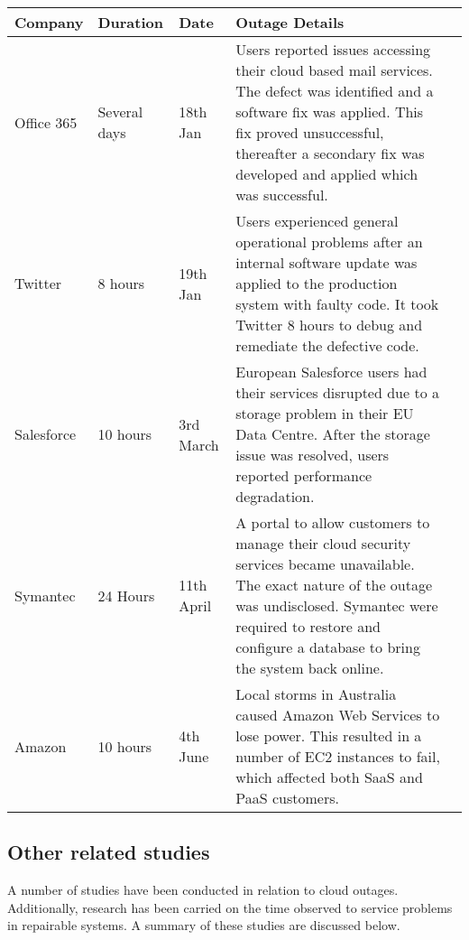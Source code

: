 \documentclass[5p]{elsarticle}
\begin{document}
\begin {table*}[]
\caption {Summary of high profile Cloud outages in the first half of 2016} 
\begin{flushleft}

\begin{tabular}{l | l | l | p{11.4cm} l} \bf {Company} & \bf {Duration} & \bf {Date} & \bf {Outage Details}  
\\ \hline Office 365 & Several days &  18th Jan & Users reported issues accessing their cloud based mail services. The defect was identified and a software fix was applied. This fix proved unsuccessful, thereafter  a secondary fix was developed and applied which was successful.
\\ \hline Twitter & 8 hours  & 19th Jan & Users experienced general operational problems after an internal software update was applied to the production system with faulty code. It took Twitter 8 hours to debug and remediate the defective code.
\\  \hline Salesforce & 10 hours  &  3rd March &  European Salesforce users had their services disrupted due to a storage problem in their EU Data Centre. After the storage issue was resolved, users reported performance degradation.
\\  \hline Symantec & 24 Hours  &  11th April &  A portal to allow customers to manage their cloud  security services became unavailable. The exact nature of the outage was undisclosed. Symantec were required to restore and configure a database to bring the system back online.
\\ \hline Amazon & 10 hours  & 4th June & Local storms in Australia caused Amazon Web Services to lose power. This resulted in a number of EC2 instances to fail, which affected both SaaS and PaaS customers. 
\\ \hline 

 \end{tabular}
\end{flushleft}
\end{table*}

\subsection{Other related studies}
A number of studies have been conducted in relation to cloud outages. Additionally, research has been carried on the time observed to service problems in repairable systems.  A summary of these studies are discussed below. \par
\end{document}

